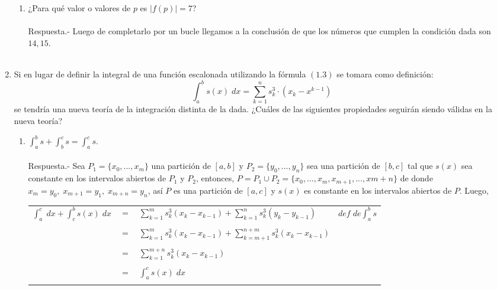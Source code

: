 \begin{enumerate}
\begin{enumerate}[\bfseries (a)]
	\item ¿Para qué valor o valores de $p$ es $|f(p)|=7$?\\\\
	    Respuesta.-\; Luego de completarlo por un bucle llegamos a la conclusión de que los números que cumplen la condición dada son $14,15$.\\\\

    \end{enumerate}

    \item  Si en lugar de definir la integral de una función escalonada utilizando la fórmula $(1.3)$ se tomara como definición: $$\displaystyle\int_{a}^{b} s(x)\; dx = \sum\limits_{k=1}^{n} s_k^3 \cdot (x_k - x^{k-1})$$ se tendría una nueva teoría de la integración distinta de la dada. ¿Cuáles de las siguientes propiedades seguirán siendo válidas en la nueva teoría?

    \begin{enumerate}[\bfseries (a)]
	
	\item $\displaystyle\int_{a}^{b} s + \int_{b}^{c} s = \int_{a}^{c} s.$\\\\
	    Respuesta.-\; Sea $P_1 =\lbrace x_0,...,x_m\rbrace$ una partición de $[a,b]$ y $P_2 = \lbrace y_0,...,y_n \rbrace$ sea una partición de $[b,c]$ tal que $s(x)$ sea constante en los intervalos abiertos de $P_1$ y $P_2$, entonces, $P=P_1\cup P_2 =\lbrace x_0,...,x_m,x_{m+1},...,x{m+n} \rbrace$ de donde $x_m = y_0, \; x_{m+1} = y_1, \; x_{m+n} = y_n$, así $P$ es una partición de $[a,c]$ y $s(x)$ es constante en los intervalos abiertos de $P$. Luego,
	    \begin{center}
		\begin{tabular}{rcll}
		    $\displaystyle\int_{a}^{c} \; dx + \int_{c}^{b} s(x) \; dx$&$=$&$\sum\limits_{k=1}^{m} s_k^3 (x_k - x_{k-1}) + \sum\limits_{k=1}^{n} s_k^3 (y_k - y_{k-1})$&$def \; de \displaystyle\int_{a}^{b} s$\\\\
		    &$=$&$\sum\limits_{k=1}^{m} s_k^3 (x_k - x_{k-1}) + \sum\limits_{k=m+1}^{n+m} s_k^3 (x_k - x_{k-1})$&\\\\
		    &$=$&$\sum\limits_{k=1}^{m+n} s_k^3(x_k - x_{k-1})$&\\\\
		    &$=$&$\displaystyle\int_{a}^{c} s(x) \; dx$&\\\\
		\end{tabular}
	    \end{center}


\end{enumerate}
\end{enumerate}
